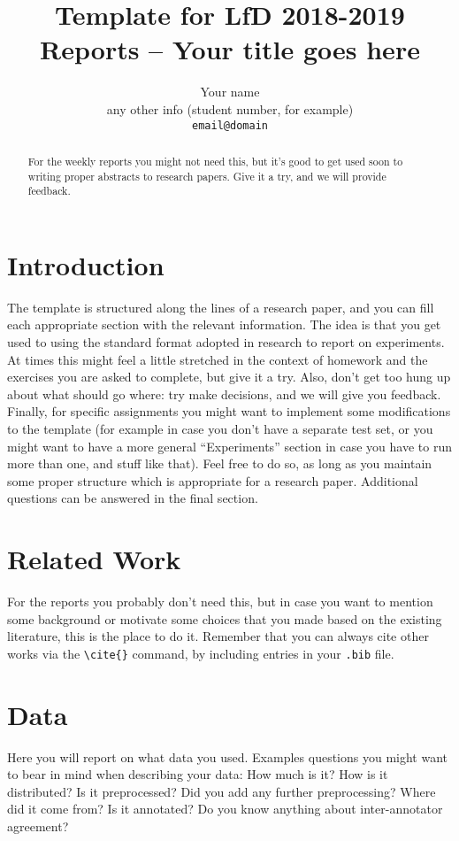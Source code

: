 \documentclass[11pt]{article}
\title{Template for LfD 2018-2019 Reports -- Your title goes here}
\author{Your name \\
  any other info (student number, for example) \\
  {\tt email@domain}}
\date{}
\begin{document}
\maketitle
\begin{abstract}
 For the weekly reports you might not need this, but it's good to get used soon to writing proper abstracts to research papers. Give it a try, and we will provide feedback.
 \end{abstract}



\section{Introduction}

 The template is structured along the lines of a research paper, and you can fill each appropriate section with the relevant information. The idea is that you get used to using the standard format adopted in research to report on experiments. At times this might feel a little stretched in the context of homework and the exercises you are asked to complete, but give it a try. Also, don't get too hung up about what should go where: try make decisions, and we will give you feedback. Finally, for specific assignments you might want to implement some modifications to the template (for example in case you don't have a separate test set, or you might want to have a more general ``Experiments'' section in case you have to run more than one, and stuff like that). Feel free to do so, as long as you maintain some proper structure which is appropriate for a research paper. Additional questions can be answered in the final section.

\section{Related Work}

For the reports you probably don't need this, but in case you want to mention some background or motivate some choices that you made based on the existing literature, this is the place to do it. Remember that you can always cite other works via the \verb!\cite{}! command, by including entries in your \verb!.bib! file. 

\section{Data}

Here you will report on what data you used.  Examples questions you might want to bear in mind when describing your data: How much is it? How is it distributed? Is it preprocessed? Did you add any further preprocessing? Where did it come from? Is it annotated? Do you know anything about inter-annotator agreement?
\end{document}

